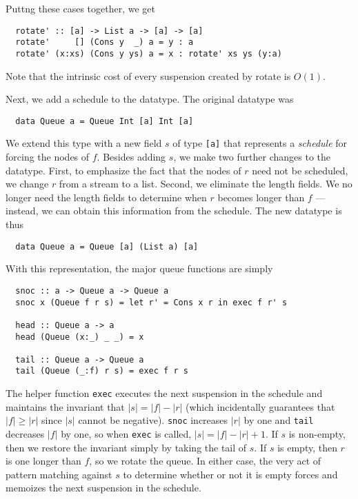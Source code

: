 \documentclass[12pt, a4paper]{article} %
\newcommand{\code}[1]{\texttt{#1}} %
\begin{document}
Puttng these cases together, we get

\begin{verbatim}
  rotate' :: [a] -> List a -> [a] -> [a]
  rotate'     [] (Cons y  _) a = y : a
  rotate' (x:xs) (Cons y ys) a = x : rotate' xs ys (y:a)
\end{verbatim}

Note that the intrinsic cost of every suspension created by rotate is $O(1)$.

Next, we add a schedule to the datatype. The original datatype was

\begin{verbatim}
  data Queue a = Queue Int [a] Int [a]
\end{verbatim}

We extend this type with a new field $s$ of type \code{[a]} that represents a \textit{schedule} for forcing the nodes of $f$. Besides adding $s$, we make two further changes to the datatype. First, to emphasize the fact that the nodes of $r$ need not be scheduled, we change $r$ from a stream to a list. Second, we eliminate the length fields. We no longer need the length fields to determine when $r$ becomes longer than $f$ --- instead, we can obtain this information from the schedule. The new datatype is thus

\begin{verbatim}
  data Queue a = Queue [a] (List a) [a]
\end{verbatim}

With this representation, the major queue functions are simply

\begin{verbatim}
  snoc :: a -> Queue a -> Queue a
  snoc x (Queue f r s) = let r' = Cons x r in exec f r' s

  head :: Queue a -> a
  head (Queue (x:_) _ _) = x

  tail :: Queue a -> Queue a
  tail (Queue (_:f) r s) = exec f r s
\end{verbatim}

The helper function \code{exec} executes the next suspension in the schedule and maintains the invariant that $|s| = |f| - |r|$ (which incidentally guarantees that $|f| \geq |r|$ since $|s|$ cannot be negative). \code{snoc} increases $|r|$ by one and \code{tail} decreases $|f|$ by one, so when \code{exec} is called, $|s| = |f| - |r| + 1$. If $s$ is non-empty, then we restore the invariant simply by taking the tail of $s$. If $s$ is empty, then $r$ is one longer than $f$, so we rotate the queue. In either case, the very act of pattern matching against $s$ to determine whether or not it is empty forces and memoizes the next suspension in the schedule.
\end{document}
